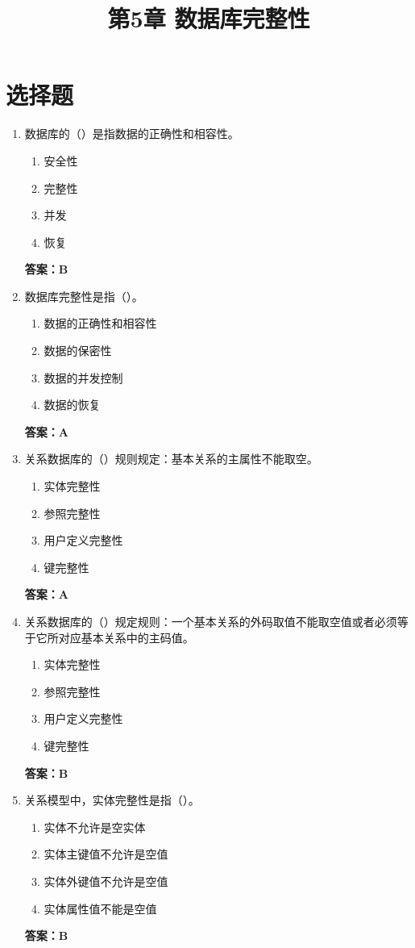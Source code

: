 \documentclass[12pt, a4paper]{article}
\title{\textbf{第5章 数据库完整性}}
\date{}
\begin{document}
\section{选择题}

\begin{enumerate}[label=\arabic*.]
	\item 数据库的（\quad）是指数据的正确性和相容性。
	      \begin{enumerate}
		      \item 安全性
		      \item 完整性
		      \item 并发
		      \item 恢复
	      \end{enumerate}
	      \textbf{答案：B}

	\item 数据库完整性是指（\quad）。
	      \begin{enumerate}
		      \item 数据的正确性和相容性
		      \item 数据的保密性
		      \item 数据的并发控制
		      \item 数据的恢复
	      \end{enumerate}
	      \textbf{答案：A}

	\item 关系数据库的（\quad）规则规定：基本关系的主属性不能取空。
	      \begin{enumerate}
		      \item 实体完整性
		      \item 参照完整性
		      \item 用户定义完整性
		      \item 键完整性
	      \end{enumerate}
	      \textbf{答案：A}

	\item 关系数据库的（\quad）规定规则：一个基本关系的外码取值不能取空值或者必须等于它所对应基本关系中的主码值。
	      \begin{enumerate}
		      \item 实体完整性
		      \item 参照完整性
		      \item 用户定义完整性
		      \item 键完整性
	      \end{enumerate}
	      \textbf{答案：B}

	\item 关系模型中，实体完整性是指（\quad）。
	      \begin{enumerate}
		      \item 实体不允许是空实体
		      \item 实体主键值不允许是空值
		      \item 实体外键值不允许是空值
		      \item 实体属性值不能是空值
	      \end{enumerate}
	      \textbf{答案：B}


\end{enumerate}
\end{document}
